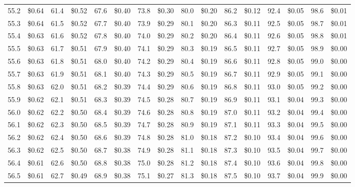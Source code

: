\documentclass{article}
\begin{document}
\begin{tabular}{|*{8}{rr|}}
55.2 & \$0.64 & 61.4 & \$0.52 & 67.6 & \$0.40 & 73.8 & \$0.30 & 80.0 & \$0.20 & 86.2 & \$0.12 & 92.4 & \$0.05 & 98.6 & \$0.01\\
55.3 & \$0.64 & 61.5 & \$0.52 & 67.7 & \$0.40 & 73.9 & \$0.29 & 80.1 & \$0.20 & 86.3 & \$0.11 & 92.5 & \$0.05 & 98.7 & \$0.01\\
55.4 & \$0.63 & 61.6 & \$0.52 & 67.8 & \$0.40 & 74.0 & \$0.29 & 80.2 & \$0.20 & 86.4 & \$0.11 & 92.6 & \$0.05 & 98.8 & \$0.01\\
55.5 & \$0.63 & 61.7 & \$0.51 & 67.9 & \$0.40 & 74.1 & \$0.29 & 80.3 & \$0.19 & 86.5 & \$0.11 & 92.7 & \$0.05 & 98.9 & \$0.00\\
55.6 & \$0.63 & 61.8 & \$0.51 & 68.0 & \$0.40 & 74.2 & \$0.29 & 80.4 & \$0.19 & 86.6 & \$0.11 & 92.8 & \$0.05 & 99.0 & \$0.00\\
55.7 & \$0.63 & 61.9 & \$0.51 & 68.1 & \$0.40 & 74.3 & \$0.29 & 80.5 & \$0.19 & 86.7 & \$0.11 & 92.9 & \$0.05 & 99.1 & \$0.00\\
55.8 & \$0.63 & 62.0 & \$0.51 & 68.2 & \$0.39 & 74.4 & \$0.29 & 80.6 & \$0.19 & 86.8 & \$0.11 & 93.0 & \$0.05 & 99.2 & \$0.00\\
55.9 & \$0.62 & 62.1 & \$0.51 & 68.3 & \$0.39 & 74.5 & \$0.28 & 80.7 & \$0.19 & 86.9 & \$0.11 & 93.1 & \$0.04 & 99.3 & \$0.00\\
56.0 & \$0.62 & 62.2 & \$0.50 & 68.4 & \$0.39 & 74.6 & \$0.28 & 80.8 & \$0.19 & 87.0 & \$0.11 & 93.2 & \$0.04 & 99.4 & \$0.00\\
56.1 & \$0.62 & 62.3 & \$0.50 & 68.5 & \$0.39 & 74.7 & \$0.28 & 80.9 & \$0.19 & 87.1 & \$0.11 & 93.3 & \$0.04 & 99.5 & \$0.00\\
56.2 & \$0.62 & 62.4 & \$0.50 & 68.6 & \$0.39 & 74.8 & \$0.28 & 81.0 & \$0.18 & 87.2 & \$0.10 & 93.4 & \$0.04 & 99.6 & \$0.00\\
56.3 & \$0.62 & 62.5 & \$0.50 & 68.7 & \$0.38 & 74.9 & \$0.28 & 81.1 & \$0.18 & 87.3 & \$0.10 & 93.5 & \$0.04 & 99.7 & \$0.00\\
56.4 & \$0.61 & 62.6 & \$0.50 & 68.8 & \$0.38 & 75.0 & \$0.28 & 81.2 & \$0.18 & 87.4 & \$0.10 & 93.6 & \$0.04 & 99.8 & \$0.00\\
56.5 & \$0.61 & 62.7 & \$0.49 & 68.9 & \$0.38 & 75.1 & \$0.27 & 81.3 & \$0.18 & 87.5 & \$0.10 & 93.7 & \$0.04 & 99.9 & \$0.00\\

\end{tabular}
\end{document}
